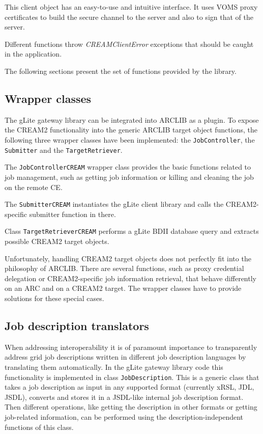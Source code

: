 \documentclass{article}
\begin{document}
This client object has an easy-to-use and intuitive interface. It uses VOMS proxy certificates to build the secure channel to the server and also to sign that of the server.

Different functions throw \textit{CREAMClientError} exceptions that should be caught in the application.

The following sections present the set of functions provided by the library.

\subsection{Wrapper classes}
\label{Wrapper classes}
The gLite gateway library can be integrated into ARCLIB as a plugin. To expose the CREAM2 functionality into the generic ARCLIB target object functions, the following three wrapper classes have been implemented: the \texttt{JobController}, the \texttt{Submitter} and the \texttt{TargetRetriever}.

The \texttt{JobControllerCREAM} wrapper class provides the basic functions related to job management, such as getting job information or killing and cleaning the job on the remote CE.

The \texttt{SubmitterCREAM} instantiates the gLite client library and calls the CREAM2-specific submitter function in there.

Class \texttt{TargetRetrieverCREAM} performs a gLite BDII database query and extracts possible CREAM2 target objects.

Unfortunately, handling CREAM2 target objects does not perfectly fit into the philosophy of ARCLIB. There are several functions, such as proxy credential delegation or CREAM2-specific job information retrieval, that behave differently on an ARC and on a CREAM2 target. The wrapper classes have to provide solutions for these special cases.

\subsection{Job description translators}
\label{Job description}
When addressing interoperability it is of paramount importance to transparently address grid job descriptions written in different job description languages by translating them automatically. In the gLite gateway library code this functionality is implemented in class \texttt{JobDescription}. This is a generic class that takes a job description as input in any supported format (currently xRSL, JDL, JSDL), converts and stores it in a JSDL-like internal job description format. Then different operations, like getting the description in other formats or getting job-related information, can be performed using the description-independent functions of this class.
\end{document}
